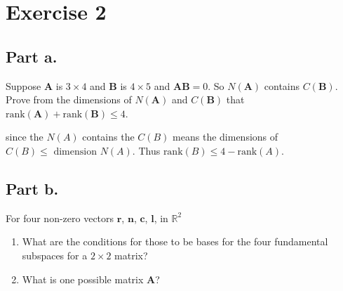 \newcommand{\matA}{\mathbf{A}}
\newcommand{\matB}{\mathbf{B}}
\section{Exercise 2}
\subsection{Part a.}
Suppose $\mathbf{A}$ is $3 \times 4$ and $\mathbf{B}$ is $4 \times 5$ and
$\matA \matB =0$. So $N(\matA)$ contains $C(\matB)$. Prove from the
dimensions of $N(\matA)$ and $C(\matB)$ that $\text{rank}(\matA) +
\text{rank}(\matB) \leq 4$. 

\begin{mdframed}[style=MyFrame]
    since the $N(A)$ contains the $C(B)$ means the dimensions of $C(B) \leq
    \text{ dimension } N(A)$. Thus $\text{rank}(B) \leq 4 - \text{
        rank}(A)$.
\end{mdframed}

\subsection{Part b.}
For four non-zero vectors $\mathbf{r}$, $\mathbf{n}$, $\mathbf{c}$,
$\mathbf{l}$, in $\mathbb{R}^{2}$
\begin{enumerate}[label=(\alph*)]
    \item What are the conditions for those to be bases for the four
        fundamental subspaces for a $2 \times 2$ matrix?
    \item What is one possible matrix $\matA$?
\end{enumerate}

